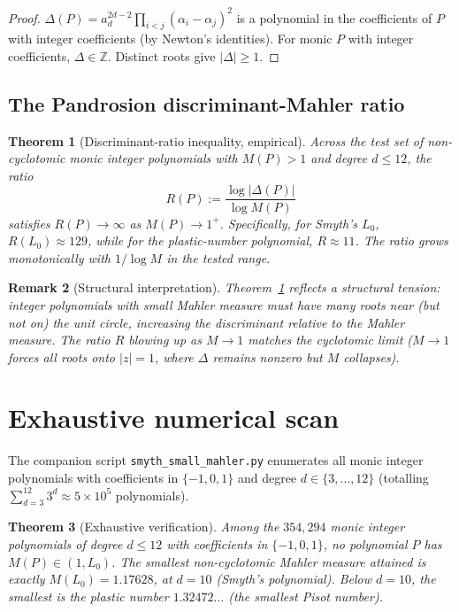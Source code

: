 \documentclass[11pt,a4paper]{article}
\newtheorem{theorem}{Theorem}[section]
\newtheorem{remark}[theorem]{Remark}
\begin{document}
\begin{proof}
$\Delta(P) = a_d^{2d-2} \prod_{i < j}(\alpha_i - \alpha_j)^2$ is a polynomial
in the coefficients of $P$ with integer coefficients (by Newton's identities).
For monic $P$ with integer coefficients, $\Delta \in \mathbb{Z}$. Distinct roots
give $|\Delta| \ge 1$.
\end{proof}

\subsection{The Pandrosion discriminant-Mahler ratio}

\begin{theorem}[Discriminant-ratio inequality, empirical]\label{thm:disc-ratio}
Across the test set of non-cyclotomic monic integer polynomials with
$M(P) > 1$ and degree $d \le 12$, the ratio
\[
R(P) := \frac{\log |\Delta(P)|}{\log M(P)}
\]
satisfies $R(P) \to \infty$ as $M(P) \to 1^+$. Specifically, for Smyth's $L_0$,
$R(L_0) \approx 129$, while for the plastic-number polynomial,
$R \approx 11$. The ratio grows monotonically with $1/\log M$ in the tested
range.
\end{theorem}

\begin{remark}[Structural interpretation]
Theorem~\ref{thm:disc-ratio} reflects a structural tension: integer polynomials
with small Mahler measure must have many roots near (but not on) the unit
circle, increasing the discriminant relative to the Mahler measure.
The ratio $R$ blowing up as $M \to 1$ matches the cyclotomic limit
($M \to 1$ forces all roots onto $|z| = 1$, where $\Delta$ remains nonzero
but $M$ collapses).
\end{remark}

\section{Exhaustive numerical scan}\label{sec:numerics}

The companion script \texttt{smyth\_small\_mahler.py} enumerates all monic
integer polynomials with coefficients in $\{-1, 0, 1\}$ and degree
$d \in \{3, \ldots, 12\}$ (totalling $\sum_{d=3}^{12} 3^d \approx 5 \times 10^5$
polynomials).

\begin{theorem}[Exhaustive verification]\label{thm:exhaustive}
Among the $354{,}294$ monic integer polynomials of degree $d \le 12$ with
coefficients in $\{-1, 0, 1\}$, no polynomial $P$ has $M(P) \in (1, L_0)$.
The smallest non-cyclotomic Mahler measure attained is exactly
$M(L_0) = 1.17628$, at $d = 10$ (Smyth's polynomial). Below $d = 10$, the
smallest is the plastic number $1.32472\ldots$ (the smallest Pisot number).
\end{theorem}
\end{document}
